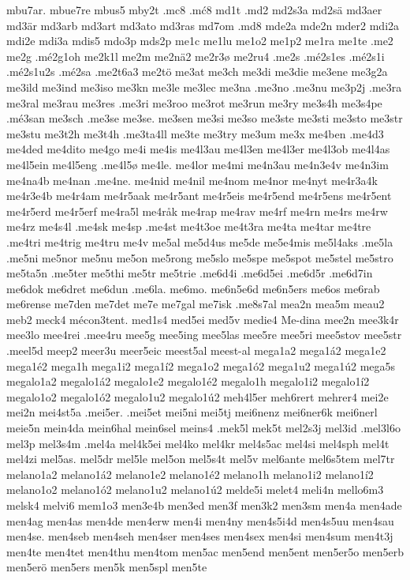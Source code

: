 {{mbu7ar.
mbue7re
mbus5
mby2t
.mc8
.mć8
md1t
.md2
md2s3a
md2sä
md3aer
md3är
md3arb
md3art
md3ato
md3ras
md7om
.md8
mde2a
mde2n
mder2
mdi2a
mdi2e
mdi3a
mdis5
mdo3p
mds2p
me1c
me1lu
me1o2
me1p2
me1ra
me1te
.me2
me2g
.mé2g1oh
me2k1l
me2m
me2nä2
me2r3ø
me2ru4
.me2s
.mé2s1es
.mé2s1i
.mé2s1u2s
.mé2sa
.me2t6a3
me2tö
me3at
me3ch
me3di
me3die
me3ene
me3g2a
me3ild
me3ind
me3iso
me3kn
me3le
me3lec
me3na
.me3no
.me3nu
me3p2j
.me3ra
me3ral
me3rau
me3res
.me3ri
me3roo
me3rot
me3run
me3ry
me3s4h
me3s4pe
.mé3san
me3sch
.me3se
me3se.
me3sen
me3si
me3so
me3ste
me3sti
me3sto
me3str
me3stu
me3t2h
me3t4h
.me3ta4ll
me3te
me3try
me3um
me3x
me4ben
.me4d3
me4ded
me4dito
me4go
me4i
me4is
me4l3au
me4l3en
me4l3er
me4l3ob
me4l4as
me4l5ein
me4l5eng
.me4l5ø
me4le.
me4lor
me4mi
me4n3au
me4n3e4v
me4n3im
me4na4b
me4nan
.me4ne.
me4nid
me4nil
me4nom
me4nor
me4nyt
me4r3a4k
me4r3e4b
me4r4am
me4r5aak
me4r5ant
me4r5eis
me4r5end
me4r5ens
me4r5ent
me4r5erd
me4r5erf
me4ra5l
me4råk
me4rap
me4rav
me4rf
me4rn
me4rs
me4rw
me4rz
me4s4l
.me4sk
me4sp
.me4st
me4t3oe
me4t3ra
me4ta
me4tar
me4tre
.me4tri
me4trig
me4tru
me4v
me5al
me5d4us
me5de
me5e4mis
me5l4aks
.me5la
.me5ni
me5nor
me5nu
me5on
me5rong
me5slo
me5spe
me5spot
me5stel
me5stro
me5ta5n
.me5ter
me5thi
me5tr
me5trie
.me6d4i
.me6d5ei
.me6d5r
.me6d7in
me6dok
me6dret
me6dun
.me6la.
me6mo.
me6n5e6d
me6n5ers
me6os
me6rab
me6rense
me7den
me7det
me7e
me7gal
me7isk
.me8s7al
mea2n
mea5m
meau2
meb2
meck4
mécon3tent.
med1s4
med5ei
med5v
medie4
Me-dina
mee2n
mee3k4r
mee3lo
mee4rei
.mee4ru
mee5g
mee5ing
mee5las
mee5re
mee5ri
mee5stov
mee5str
.meel5d
meep2
meer3u
meer5eic
meest5al
meest-al
mega1a2
mega1á2
mega1e2
mega1é2
mega1h
mega1i2
mega1í2
mega1o2
mega1ó2
mega1u2
mega1ú2
mega5s
megalo1a2
megalo1á2
megalo1e2
megalo1é2
megalo1h
megalo1i2
megalo1í2
megalo1o2
megalo1ó2
megalo1u2
megalo1ú2
meh4l5er
meh6rert
mehrer4
mei2e
mei2n
mei4st5a
.mei5er.
.mei5et
mei5ni
mei5tj
mei6nenz
mei6ner6k
mei6nerl
meie5n
mein4da
mein6hal
mein6sel
meins4
.mek5l
mek5t
mel2s3j
mel3id
.mel3l6o
mel3p
mel3s4m
.mel4a
mel4k5ei
mel4ko
mel4kr
mel4s5ac
mel4si
mel4sph
mel4t
mel4zi
mel5as.
mel5dr
mel5le
mel5on
mel5s4t
mel5v
mel6ante
mel6s5tem
mel7tr
melano1a2
melano1á2
melano1e2
melano1é2
melano1h
melano1i2
melano1í2
melano1o2
melano1ó2
melano1u2
melano1ú2
melde5i
melet4
meli4n
mello6m3
melsk4
melvi6
mem1o3
men3e4b
men3ed
men3f
men3k2
men3sm
men4a
men4ade
men4ag
men4as
men4de
men4erw
men4i
men4ny
men4s5i4d
men4s5uu
men4sau
men4se.
men4seb
men4seh
men4ser
men4ses
men4sex
men4si
men4sum
men4t3j
men4te
men4tet
men4thu
men4tom
men5ac
men5end
men5ent
men5er5o
men5erb
men5erö
men5ers
men5k
men5spl
men5te
}}

